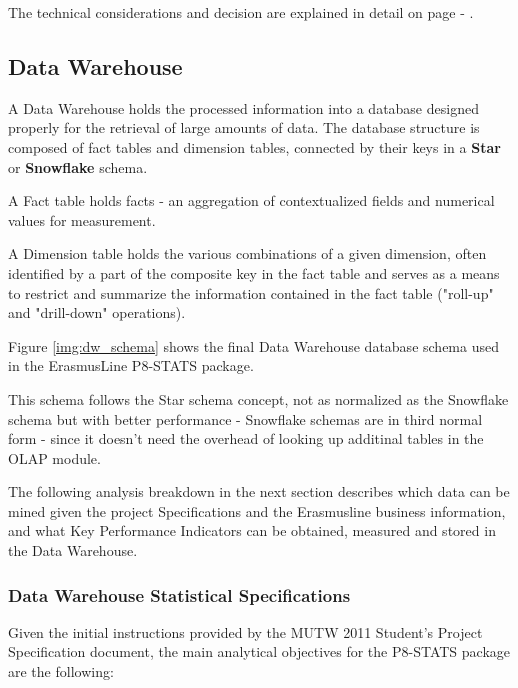 The technical considerations and decision are explained in detail on page
\pageref{ssec:mysql_merge} - .


\newpage
\subsection{Data Warehouse}

A Data Warehouse holds the processed information into a database designed
properly for the retrieval of large amounts of data. The database structure is
composed of fact tables and dimension tables, connected by their keys in a
\textbf{Star} or \textbf{Snowflake} schema\cite{dwtk}.

A Fact table holds facts - an aggregation of contextualized fields and numerical
values for measurement\cite{dwtk}.

A Dimension table holds the various combinations of a given dimension, often
identified by a part of the composite key in the fact table and serves as a
means to restrict and summarize the information contained in the fact table
("roll-up" and "drill-down" operations)\cite{dwtk}.

Figure \ref{img:dw_schema} shows the final Data Warehouse database schema used
in the ErasmusLine P8-STATS package.

This schema follows the Star schema concept, not as normalized as the Snowflake
schema but with better performance\cite{dwtk} - Snowflake schemas are in third
normal form - since it doesn't need the overhead of looking up additinal tables
in the OLAP module.

The following analysis breakdown in the next section describes which data can be
mined given the project Specifications and the Erasmusline business information,
and what Key Performance Indicators can be obtained, measured and stored in the
Data Warehouse.

\newpage
{}
\newpage

\subsubsection{Data Warehouse Statistical Specifications}

Given the initial instructions provided by the MUTW 2011 Student's Project
Specification document, the main analytical objectives for the P8-STATS package
are the following:

